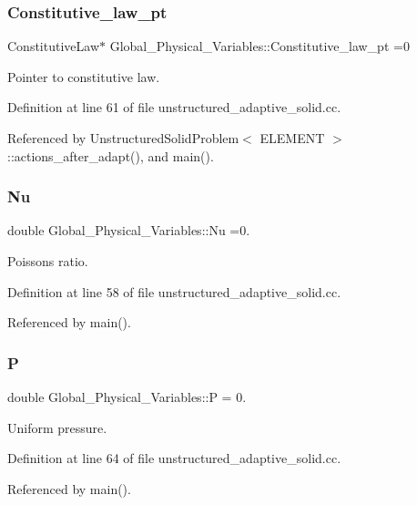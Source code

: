 \subsubsection{\texorpdfstring{Constitutive\+\_\+law\+\_\+pt}{Constitutive\_law\_pt}}
{\footnotesize\ttfamily Constitutive\+Law$\ast$ Global\+\_\+\+Physical\+\_\+\+Variables\+::\+Constitutive\+\_\+law\+\_\+pt =0}



Pointer to constitutive law. 



Definition at line 61 of file unstructured\+\_\+adaptive\+\_\+solid.\+cc.



Referenced by Unstructured\+Solid\+Problem$<$ E\+L\+E\+M\+E\+N\+T $>$\+::actions\+\_\+after\+\_\+adapt(), and main().

\mbox{\label{namespaceGlobal__Physical__Variables_a3962c36313826b19f216f6bbbdd6a477}} 
\subsubsection{\texorpdfstring{Nu}{Nu}}
{\footnotesize\ttfamily double Global\+\_\+\+Physical\+\_\+\+Variables\+::\+Nu =0.}



Poisson\textquotesingle{}s ratio. 



Definition at line 58 of file unstructured\+\_\+adaptive\+\_\+solid.\+cc.



Referenced by main().

\mbox{\label{namespaceGlobal__Physical__Variables_a23c2ade6398f54040b869f7f3a2bcc4b}} 
\subsubsection{\texorpdfstring{P}{P}}
{\footnotesize\ttfamily double Global\+\_\+\+Physical\+\_\+\+Variables\+::P = 0.}



Uniform pressure. 



Definition at line 64 of file unstructured\+\_\+adaptive\+\_\+solid.\+cc.



Referenced by main().

